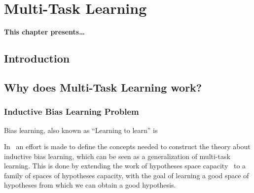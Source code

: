 
\chapter{Multi-Task Learning} %
\label{Chapter2}

{\bf \small{
This chapter presents\dots
}}

\section{Introduction}



\section{Why does Multi-Task Learning work?}
% 
\subsection{Inductive Bias Learning Problem} %
Bias learning, also known as ``Learning to learn'' is 

In~\cite{baxter2000model} an effort is made to define the concepts needed to construct the theory about inductive bias learning, which can be seen as a generalization of multi-task learning. This is done by extending the work of hypotheses space capacity~\cite{vapnik2013nature} to a family of spaces of hypotheses capacity, with the goal of learning a good space of hypotheses from which we can obtain a good hypothesis.

